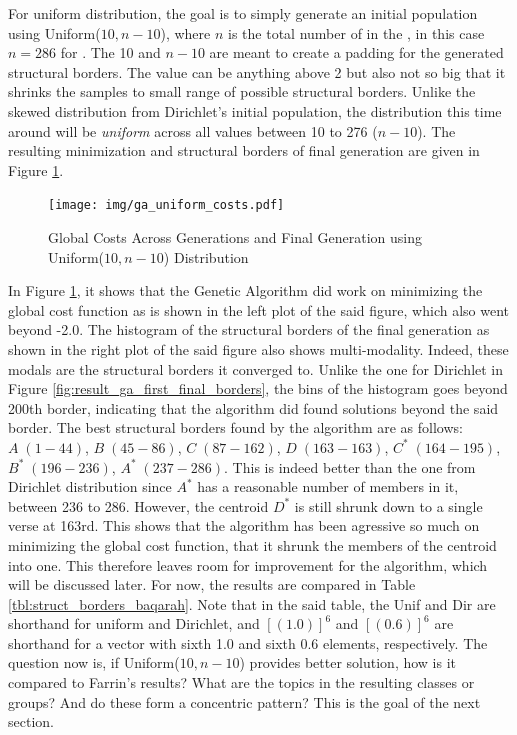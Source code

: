 For uniform distribution, the goal is to simply generate an initial population using Uniform($10,n-10$), where $n$ is the total number of   in the  , in this case $n=286$ for  . The 10 and $n-10$ are meant to create a padding for the generated structural borders. The value can be anything above 2 but also not so big that it shrinks the samples to small range of possible structural borders. Unlike the skewed distribution from Dirichlet's initial population, the distribution this time around will be \textit{uniform} across all values between 10 to 276 ($n-10$). The resulting minimization and structural borders of final generation are given in Figure \ref{fig:result_ga_uniform}. 

\begin{figure}[!t]
    \centering
    \texttt{[image: img/ga\_uniform\_costs.pdf]}
    \caption{Global Costs Across Generations and Final Generation using Uniform($10,n-10$) Distribution}
    \label{fig:result_ga_uniform}
\end{figure}

In Figure \ref{fig:result_ga_uniform}, it shows that the Genetic Algorithm did work on minimizing the global cost function as is shown in the left plot of the said figure, which also went beyond -2.0. The histogram of the structural borders of the final generation as shown in the right plot of the said figure also shows multi-modality. Indeed, these modals are the structural borders it converged to. Unlike the one for Dirichlet in Figure \ref{fig:result_ga_first_final_borders}, the bins of the histogram goes beyond 200th border, indicating that the algorithm did found solutions beyond the said border. The best structural borders found by the algorithm are as follows: $A\;(1-44)$, $B\;(45-86)$, $C\;(87-162)$, $D\;(163-163)$, $C^*\;(164-195)$, $B^*\;(196-236)$, $A^*\;(237-286)$. This is indeed better than the one from Dirichlet distribution since $A^*$ has a reasonable number of members in it, between   236 to 286. However, the centroid $D^*$ is still shrunk down to a single verse at 163rd. This shows that the algorithm has been agressive so much on minimizing the global cost function, that it shrunk the members of the centroid into one. This therefore leaves room for improvement for the algorithm, which will be discussed later. For now, the results are compared in Table \ref{tbl:struct_borders_baqarah}. Note that in the said table, the Unif and Dir are shorthand for uniform and Dirichlet, and $[(1.0)]^6$ and $[(0.6)]^6$ are shorthand for a vector with sixth 1.0 and sixth 0.6 elements, respectively. The question now is, if Uniform($10,n-10$) provides better solution, how is it compared to Farrin's results? What are the topics in the resulting classes or groups? And do these form a concentric pattern? This is the goal of the next section.

